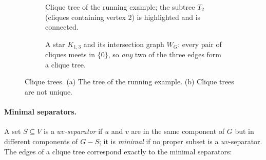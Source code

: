 \documentclass[11pt,a4paper,oneside]{report}
\theoremstyle{plain}
\theoremstyle{definition}
\theoremstyle{remark}
\begin{document}
\begin{figure}[ht]
\centering
\begin{subfigure}[b]{0.46\textwidth}\centering
{}
\caption{Clique tree of the running example; the subtree \(T_2\) (cliques containing vertex 2)
is highlighted and is connected.}\label{fig:ct-example}
\end{subfigure}\hfill
\begin{subfigure}[b]{0.5\textwidth}\centering
{}
\caption{A star \(K_{1,3}\) and its intersection graph \(W_G\): every pair of cliques meets in
\(\{0\}\), so \emph{any} two of the three edges form a clique tree.}\label{fig:ct-nonunique}
\end{subfigure}
\caption[Clique trees and their non-uniqueness]{Clique trees. (a) The tree of the running example. (b) Clique trees are not unique.}
\label{fig:clique-trees}
\end{figure}

\paragraph{Minimal separators.} A set \(S\subseteq V\) is a \emph{\(uv\)-separator} if \(u\) and
\(v\) are in the same component of \(G\) but in different components of \(G-S\); it is
\emph{minimal} if no proper subset is a \(uv\)-separator. The edges of a clique tree correspond
exactly to the minimal separators:
\end{document}
